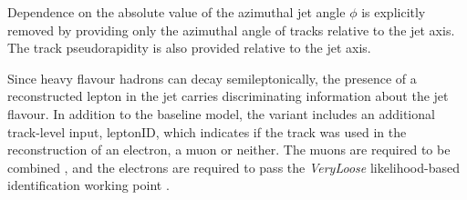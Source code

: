 Dependence on the absolute value of the azimuthal jet angle $\phi$ is explicitly removed by providing only the azimuthal angle of tracks relative to the jet axis. The track pseudorapidity is also provided relative to the jet axis.

Since heavy flavour hadrons can decay semileptonically, the presence of a reconstructed lepton in the jet carries discriminating information about the jet flavour.
In addition to the baseline \GNN model, the \GNNLep variant includes an additional track-level input, leptonID, which indicates if the track was used in the reconstruction of an electron, a muon or neither. %
The muons are required to be combined \cite{ATL-PHYS-PUB-2015-037}, and the electrons are required to pass the \textit{VeryLoose} likelihood-based identification working point \cite{PERF-2017-01}.

